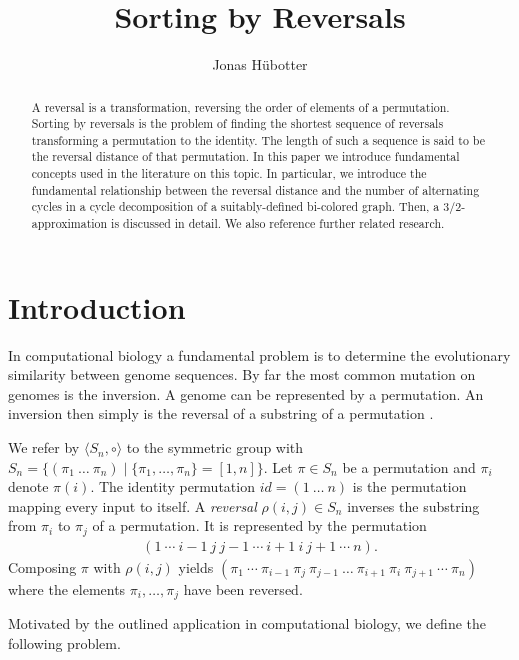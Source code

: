 \documentclass[11pt,DIV=11]{scrartcl}
\title{Sorting by Reversals}
\author{Jonas Hübotter}
\theoremstyle{definition}
\theoremstyle{remark}
\begin{document}
\maketitle

\begin{abstract}
    A reversal is a transformation, reversing the order of elements of a permutation. Sorting by reversals is the problem of finding the shortest sequence of reversals transforming a permutation to the identity. The length of such a sequence is said to be the reversal distance of that permutation. In this paper we introduce fundamental concepts used in the literature on this topic. In particular, we introduce the fundamental relationship between the reversal distance and the number of alternating cycles in a cycle decomposition of a suitably-defined bi-colored graph. Then, a $3/2$-approximation is discussed in detail. We also reference further related research.
\end{abstract}

\section{Introduction}

In computational biology a fundamental problem is to determine the evolutionary similarity between genome sequences. By far the most common mutation on genomes is the inversion. A genome can be represented by a permutation. An inversion then simply is the reversal of a substring of a permutation \cite{Kececioglu1995}.

We refer by $\langle S_n, \circ \rangle$ to the symmetric group with $S_n = \{(\pi_1\ \dots\ \pi_n) \mid \{\pi_1, \dots, \pi_n\} = [1,n]\}$. Let $\pi \in S_n$ be a permutation and $\pi_i$ denote $\pi(i)$. The identity permutation $id = (1\ \dots\ n)$ is the permutation mapping every input to itself. A \textit{reversal} $\rho(i,j) \in S_n$ inverses the substring from $\pi_i$ to $\pi_j$ of a permutation. It is represented by the permutation
\begin{align*}
    (1\ \cdots\ i-1\ j\ j-1\ \cdots\ i+1\ i\ j+1\ \cdots\ n).
\end{align*}
Composing $\pi$ with $\rho(i,j)$ yields $(\pi_1\ \cdots\ \pi_{i-1}\ \pi_j\ \pi_{j-1}\ \dots\ \pi_{i+1}\ \pi_i\ \pi_{j+1}\ \cdots\ \pi_n)$ where the elements $\pi_i, \dots, \pi_j$ have been reversed.

Motivated by the outlined application in computational biology, we define the following problem.
\end{document}

